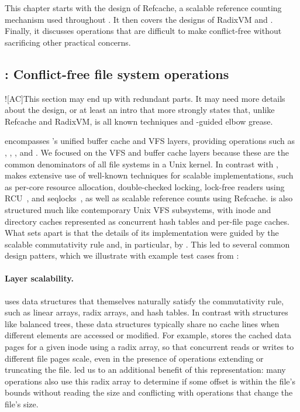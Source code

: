 This chapter starts with the design of Refcache, a scalable reference
counting mechanism used throughout \sys.  It then covers the designs
of RadixVM and \fs.  Finally, it discusses operations that are
difficult to make conflict-free without sacrificing other practical
concerns.





\subsection{\fs: Conflict-free file system operations}

\XXX![AC]{This section may end up with redundant parts.  It may need
  more details about the design, or at least an intro that more
  strongly states that, unlike Refcache and RadixVM, \fs is all known
  techniques and \tool-guided elbow grease.}

\fs encompasses \sys's unified buffer cache and VFS layers, providing
operations such as , , , and
.  We focused on the VFS and buffer cache layers because
these are the common denominators of all file systems in a Unix
kernel.
%
In contrast with \vm,
\fs makes extensive use of well-known techniques for scalable
implementations, such as per-core resource
allocation, double-checked locking, lock-free readers using
RCU~\cite{rcu:linux},
and seqlocks~\cite[\S6]{lameter:linuxsync},
as well as scalable reference counts using Refcache.
%
\fs is also structured much like contemporary Unix VFS subsystems,
with inode and directory caches represented as concurrent hash tables
and per-file page caches.
%
What sets \fs apart is that the details of its implementation were
guided by the scalable commutativity rule and, in particular, by
\tool.
%
This led to several common design patters, which we illustrate with
example test cases from \tool{}:
%


\paragraph{Layer scalability.}  \fs uses data structures that
themselves naturally satisfy the commutativity rule, such as linear
arrays, radix arrays, and hash tables.  In
contrast with structures like balanced trees, these data
structures
typically share no cache lines when different elements are accessed
or modified.  For example, \fs stores the cached data pages for a given inode
using a radix array, so that concurrent reads or writes to different
file pages scale, even in the presence of operations
extending or truncating the file.
\tool led us to an additional benefit of this representation:
many operations also use this radix array to determine if some offset
is within the file's bounds without reading the size and conflicting
with operations
that change the file's size.

